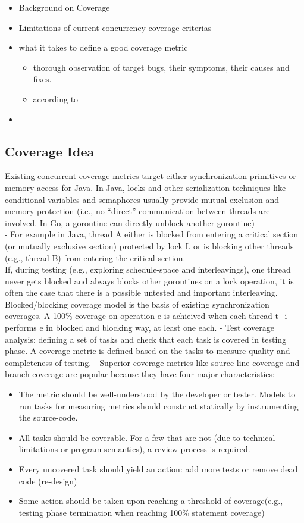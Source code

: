 \begin{itemize}
  \item Background on Coverage
  \item Limitations of current concurrency coverage criterias
  \item what it takes to define a good coverage metric
  \begin{itemize}
    \item thorough observation of target bugs, their symptoms, their causes and fixes.
    \item according to \cite{}
  \end{itemize}
  \item
\end{itemize}

\subsection{Coverage Idea}
Existing concurrent coverage metrics target either synchronization primitives or memory access for Java. In Java, locks and other serialization techniques like conditional variables and semaphores usually provide mutual exclusion and memory protection (i.e., no “direct” communication between threads are involved. In Go, a goroutine can directly unblock another goroutine)
\\
-	For example in Java,  thread A either is blocked from entering a critical section (or mutually exclusive section) protected by lock L or is blocking other threads (e.g., thread B) from entering the critical section.
\\
If, during testing (e.g., exploring schedule-space and interleavings), one thread never gets blocked and always blocks other goroutines on a lock operation, it is often the case that there is a possible untested and important interleaving. Blocked/blocking coverage model is the basis of existing synchronization coverages. A 100\% coverage on operation e is achieived when each thread t\_i performs e in blocked and blocking way, at least one each.
-	Test coverage analysis: defining a set of tasks and check that each task is covered in testing phase. A coverage metric is defined based on the tasks to measure quality and completeness of testing.
-	Superior coverage metrics like source-line coverage and branch coverage are popular because they have four major characteristics:
\begin{itemize}
  \item The metric should be well-understood by the developer or tester. Models to run tasks for measuring metrics should construct statically by instrumenting the source-code.
  \item All tasks should be coverable. For a few that are not (due to technical limitations or program semantics), a review process is required.
  \item Every uncovered task should yield an action: add more tests or remove dead code (re-design)
  \item Some action should be taken upon reaching a threshold of coverage(e.g., testing phase termination when reaching 100\% statement coverage)
\end{itemize}

